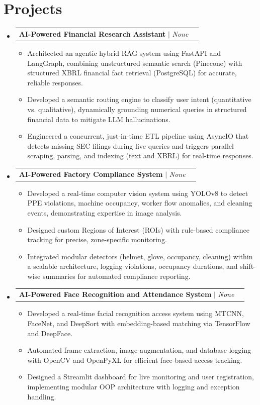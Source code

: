 \documentclass[letterpaper,11pt]{article}
\makeatletter
\newcommand{\resumeItem}[1]{
  \item\small{
    {#1 \vspace{-2pt}}
  }
}
\newcommand{\resumeProjectHeading}[2]{
    \item
    \begin{tabular*}{0.97\textwidth}{l@{\extracolsep{\fill}}r}
      \small#1 & #2 \\
    \end{tabular*}\vspace{-7pt}
}
\newcommand{\resumeSubHeadingListStart}{\begin{itemize}[leftmargin=0.15in, label={}]}
\newcommand{\resumeSubHeadingListEnd}{\end{itemize}}
\newcommand{\resumeItemListStart}{\begin{itemize}}
\newcommand{\resumeItemListEnd}{\end{itemize}\vspace{-5pt}}
\makeatother
\begin{document}
\section{Projects}
    \resumeSubHeadingListStart
            \resumeProjectHeading
          {\textbf{AI-Powered Financial Research Assistant} $|$ \emph{None}}{}
          \resumeItemListStart
                        \resumeItem{Architected an agentic hybrid RAG system using FastAPI and LangGraph, combining unstructured semantic search (Pinecone) with structured XBRL financial fact retrieval (PostgreSQL) for accurate, reliable responses.}
                        \resumeItem{Developed a semantic routing engine to classify user intent (quantitative vs. qualitative), dynamically grounding numerical queries in structured financial data to mitigate LLM hallucinations.}
                        \resumeItem{Engineered a concurrent, just-in-time ETL pipeline using AsyncIO that detects missing SEC filings during live queries and triggers parallel scraping, parsing, and indexing (text and XBRL) for real-time responses.}
                      \resumeItemListEnd
            \resumeProjectHeading
          {\textbf{AI-Powered Factory Compliance System} $|$ \emph{None}}{}
          \resumeItemListStart
                        \resumeItem{Developed a real-time computer vision system using YOLOv8 to detect PPE violations, machine occupancy, worker flow anomalies, and cleaning events, demonstrating expertise in image analysis.}
                        \resumeItem{Designed custom Regions of Interest (ROIs) with rule-based compliance tracking for precise, zone-specific monitoring.}
                        \resumeItem{Integrated modular detectors (helmet, glove, occupancy, cleaning) within a scalable architecture, logging violations, occupancy durations, and shift-wise summaries for automated compliance reporting.}
                      \resumeItemListEnd
            \resumeProjectHeading
          {\textbf{AI-Powered Face Recognition and Attendance System} $|$ \emph{None}}{}
          \resumeItemListStart
                        \resumeItem{Developed a real-time facial recognition access system using MTCNN, FaceNet, and DeepSort with embedding-based matching via TensorFlow and DeepFace.}
                        \resumeItem{Automated frame extraction, image augmentation, and database logging with OpenCV and OpenPyXL for efficient face-based access tracking.}
                        \resumeItem{Designed a Streamlit dashboard for live monitoring and user registration, implementing modular OOP architecture with logging and exception handling.}
                      \resumeItemListEnd
          \resumeSubHeadingListEnd
\end{document}
